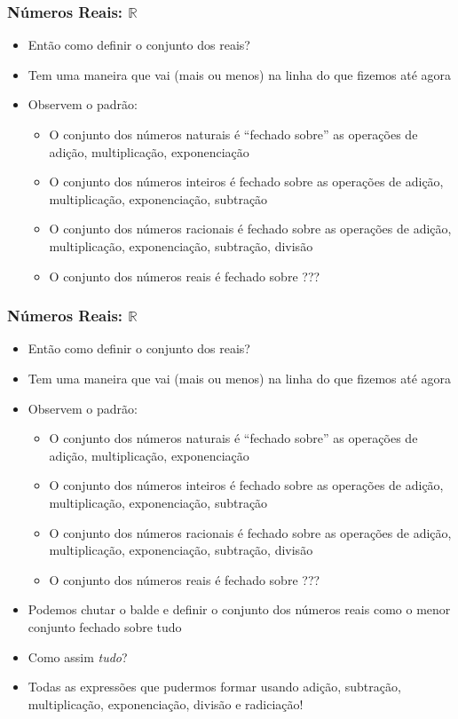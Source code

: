 \documentclass[usenames,dvipsnames,svgnames]{beamer}
\begin{document}
\begin{frame}	
	\frametitle{Números Reais: $\mathbb{R}$}

	\begin{itemize}
		\item Então como definir o conjunto dos reais?
		\item Tem uma maneira que vai (mais ou menos) na linha do que fizemos até agora
		\item Observem o padrão:
		\begin{itemize}
			\item O conjunto dos números naturais é ``fechado sobre'' as operações de adição, multiplicação, exponenciação
			\item O conjunto dos números inteiros é fechado sobre as operações de adição, multiplicação, exponenciação, subtração
			\item O conjunto dos números racionais é fechado sobre as operações de adição, multiplicação, exponenciação, subtração, divisão
			\item O conjunto dos números reais é fechado sobre {\color{red}???}
		\end{itemize}
	\end{itemize}
\end{frame}

\begin{frame}	
	\frametitle{Números Reais: $\mathbb{R}$}

	\begin{itemize}
		\item Então como definir o conjunto dos reais?
		\item Tem uma maneira que vai (mais ou menos) na linha do que fizemos até agora
		\item Observem o padrão:
		\begin{itemize}
			\item O conjunto dos números naturais é ``fechado sobre'' as operações de adição, multiplicação, exponenciação
			\item O conjunto dos números inteiros é fechado sobre as operações de adição, multiplicação, exponenciação, subtração
			\item O conjunto dos números racionais é fechado sobre as operações de adição, multiplicação, exponenciação, subtração, divisão
			\item O conjunto dos números reais é fechado sobre {\color{red}???}
		\end{itemize}
		\item Podemos chutar o balde e definir o conjunto dos números reais como o menor conjunto fechado sobre {\color{red}tudo}
		\item Como assim \emph{tudo}?
		\item Todas as expressões que pudermos formar usando adição, subtração, multiplicação, exponenciação, divisão e radiciação! 
	\end{itemize}
\end{frame}
\end{document}
